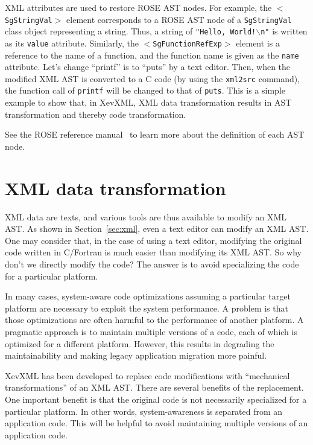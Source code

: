 XML attributes are used to restore ROSE AST nodes. For example, the
\texttt{$<$SgStringVal$>$} element corresponds to a ROSE AST node of a
\texttt{SgStringVal} class object representing a string.  Thus, a string
of \texttt{"Hello, World!$\backslash{}$n"} is written as its
\texttt{value} attribute. Similarly, the \texttt{$<$SgFunctionRefExp$>$}
element is a reference to the name of a function, and the function name
is given as the \texttt{name} attribute. Let's change ``printf'' is to
``puts'' by a text editor. Then, when the modified XML AST is converted
to a C code (by using the \texttt{xml2src} command), the function call
of \texttt{printf} will be changed to that of \texttt{puts}. This is a
simple example to show that, in XevXML, XML data transformation results
in AST transformation and thereby code transformation.

See the ROSE reference manual~\cite{rosemanual} to learn more about the
definition of each AST node.

\section{XML data transformation}\label{sec:xslt}

XML data are texts, and various tools are thus available to modify an
XML AST.  As shown in Section~\ref{sec:xml}, even a text editor can
modify an XML AST.  One may consider that, in the case of using a text
editor, modifying the original code written in C/Fortran is much easier
than modifying its XML AST. So why don't we directly modify the code?
The answer is to avoid specializing the code for a particular platform.

In many cases, system-aware code optimizations assuming a particular
target platform are necessary to exploit the system performance.  A
problem is that those optimizations are often harmful to the performance
of another platform.  A pragmatic approach is to maintain multiple
versions of a code, each of which is optimized for a different
platform. However, this results in degrading the maintainability and
making legacy application migration more painful.


XevXML has been developed to replace code modifications with
``mechanical transformations'' of an XML AST.  There are several
benefits of the replacement.  One important benefit is that the original
code is not necessarily specialized for a particular platform.  In other
words, system-awareness is separated from an application code.  This
will be helpful to avoid maintaining multiple versions of an application
code.

